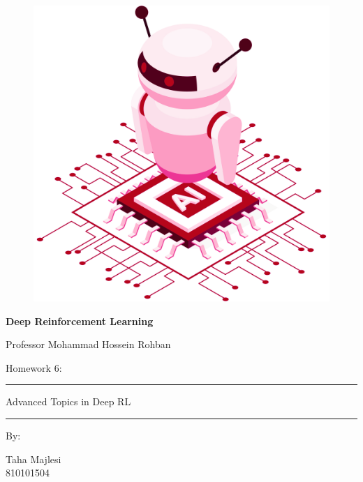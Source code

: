 \documentclass[12pt]{article}
\begin{document}
\thispagestyle{plain}

\begin{center}

\vspace*{-1.5cm}
\begin{figure}[!h]
    \centering
    \includegraphics[width=0.7\linewidth]{figs/cover-std.png}
\end{figure}

{

{\color{DarkBlue} {\fontsize{30}{50} \textbf{
Deep Reinforcement Learning
}}}

{\color{DarkBlue} {\Large
Professor Mohammad Hossein Rohban
}}
}


\vspace{20pt}

{


{\color{RedOrange}
{\Large
Homework 6:
}\\
}
{\color{BrickRed}
\rule{12cm}{0.5pt}

{\Huge
Advanced Topics in Deep RL
}
\rule{12cm}{0.5pt}
}

\vspace{10pt}

{\color{RoyalPurple} { \small By:} } \\
\vspace{10pt}

{\color{Blue} { \LARGE Taha Majlesi } } \\
\vspace{5pt}
{\color{RoyalBlue} { \Large 810101504 } }


}
\end{center}
\end{document}

